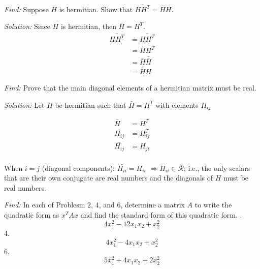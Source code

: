 \documentclass[11pt]{homework}
\begin{document}
\newpage
{}
\emph{Find:}
\newline
Suppose $H$ is hermitian. Show that $ \overline{HH^T} = \bar{H}H$.

\emph{Solution:}
\newline
Since $H$ is hermitian, then $\bar{H}=H^T$.
\begin{align*}
\overline{HH^T} &= \overline{HH^T}  \\
  &= \bar{H}\bar{H^T} \\
  &= \bar{H}\bar{\bar{H}}  \\
  &= \bar{H}H
\end{align*}

\emph{Find:}
\newline
Prove that the main diagonal elements of a hermitian matrix must be real.

\emph{Solution:}
\newline
Let $H$ be hermitian such that $\bar{H}=H^T$ with elements $H_{ij}$

\begin{align*}
  \bar{H} &= H^T \\
  \bar{H_{ij}} &= H^T_{ij} \\
  \bar{H_{ij}} &= H_{ji}  \\
\end{align*}

When $i=j$ (diagonal components): $\bar{H_{ii}} = H_{ii} $
$\Rightarrow H_{ii}\in \mathcal{R}$; i.e.,
the only scalars that are their own conjugate are real numbers
and the diagonals of $H$ must be real numbers.

\newpage
{}
\emph{Find:}
\newline
In each of Problesm 2, 4, and 6, 
determine a matrix $A$ to write the quadratic form as 
$x^TAx$ and find the standard form of this quadratic form.
.
\begin{equation*}
  4 x_1^2 - 12 x_1 x_2 + x^2_2
\end{equation*}
4. 
\begin{equation*}
  4 x_1^2 - 4 x_1 x_2 +x_2^2
\end{equation*}
6. 
\begin{equation*}
  5x_1^2 + 4 x_1 x_2 + 2 x_2^2
\end{equation*}
\end{document}
